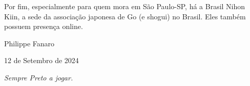 Por fim, especialmente para quem mora em São Paulo-SP, há a Brasil Nihon Kiin, a sede da associação japonesa de Go (e shogui) no Brasil. Eles também possuem presença online.

\bigskip
\bigskip

Philippe Fanaro

12 de Setembro de 2024


\emptypage

\vspace*{\fill}

\begin{center}
  \Large \emph{Sempre Preto a jogar.}
\end{center}

\vspace*{\fill}


